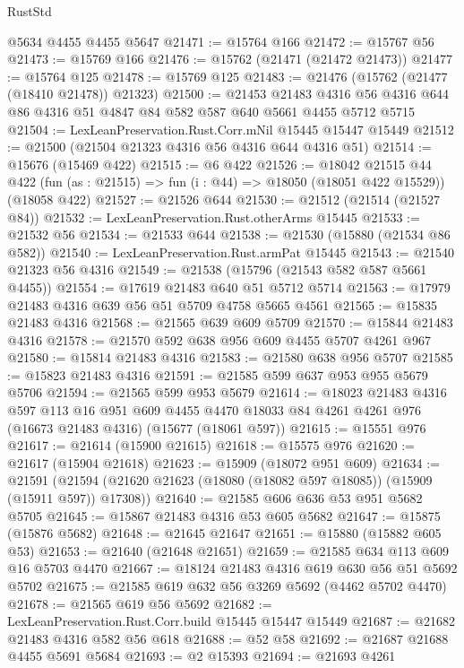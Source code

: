 \begin{lexlean}{RustStd}
\begin{coremodule}
    @5634
    @4455
    @4455
    @5647
@21471 := @15764 @166
@21472 := @15767 @56
@21473 := @15769 @166
@21476 := @15762 (@21471 (@21472 @21473))
@21477 := @15764 @125
@21478 := @15769 @125
@21483 := @21476 (@15762 (@21477 (@18410 @21478)) @21323)
@21500 := @21453
    @21483
    @4316
    @56
    @4316
    @644
    @86
    @4316
    @51
    @4847
    @84
    @582
    @587
    @640
    @5661
    @4455
    @5712
    @5715
@21504 := LexLeanPreservation.Rust.Corr.mNil @15445 @15447 @15449
@21512 := @21500 (@21504 @21323 @4316 @56 @4316 @644 @4316 @51)
@21514 := @15676 (@15469 @422)
@21515 := @6 @422
@21526 := @18042
    @21515
    @44
    @422
    (fun (as : @21515) => fun (i : @44) => @18050 (@18051 @422 @15529))
    (@18058 @422)
@21527 := @21526 @644
@21530 := @21512 (@21514 (@21527 @84))
@21532 := LexLeanPreservation.Rust.otherArms @15445
@21533 := @21532 @56
@21534 := @21533 @644
@21538 := @21530 (@15880 (@21534 @86 @582))
@21540 := LexLeanPreservation.Rust.armPat @15445
@21543 := @21540 @21323 @56 @4316
@21549 := @21538 (@15796 (@21543 @582 @587 @5661 @4455))
@21554 := @17619 @21483 @640 @51 @5712 @5714
@21563 := @17979 @21483 @4316 @639 @56 @51 @5709 @4758 @5665 @4561
@21565 := @15835 @21483 @4316
@21568 := @21565 @639 @609 @5709
@21570 := @15844 @21483 @4316
@21578 := @21570 @592 @638 @956 @609 @4455 @5707 @4261 @967
@21580 := @15814 @21483 @4316
@21583 := @21580 @638 @956 @5707
@21585 := @15823 @21483 @4316
@21591 := @21585 @599 @637 @953 @955 @5679 @5706
@21594 := @21565 @599 @953 @5679
@21614 := @18023
    @21483
    @4316
    @597
    @113
    @16
    @951
    @609
    @4455
    @4470
    @18033
    @84
    @4261
    @4261
    @976
    (@16673 @21483 @4316)
    (@15677 (@18061 @597))
@21615 := @15551 @976
@21617 := @21614 (@15900 @21615)
@21618 := @15575 @976
@21620 := @21617 (@15904 @21618)
@21623 := @15909 (@18072 @951 @609)
@21634 := @21591
    (@21594 (@21620 @21623 (@18080 (@18082 @597 @18085)) (@15909 (@15911 @597)) @17308))
@21640 := @21585 @606 @636 @53 @951 @5682 @5705
@21645 := @15867 @21483 @4316 @53 @605 @5682
@21647 := @15875 (@15876 @5682)
@21648 := @21645 @21647
@21651 := @15880 (@15882 @605 @53)
@21653 := @21640 (@21648 @21651)
@21659 := @21585 @634 @113 @609 @16 @5703 @4470
@21667 := @18124 @21483 @4316 @619 @630 @56 @51 @5692 @5702
@21675 := @21585 @619 @632 @56 @3269 @5692 (@4462 @5702 @4470)
@21678 := @21565 @619 @56 @5692
@21682 := LexLeanPreservation.Rust.Corr.build @15445 @15447 @15449
@21687 := @21682 @21483 @4316 @582 @56 @618
@21688 := @52 @58
@21692 := @21687 @21688 @4455 @5691 @5684
@21693 := @2 @15393
@21694 := @21693 @4261

\end{coremodule}
\end{lexlean}
